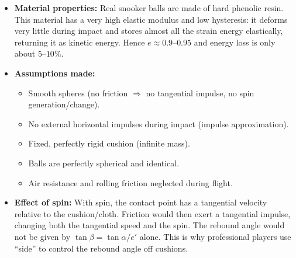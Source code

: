 \documentclass[11pt]{article}
\begin{document}
\begin{corrige}
\begin{itemize}
\item \textbf{Material properties:} Real snooker balls are made of hard phenolic resin. This material has a very high elastic modulus and low hysteresis: it deforms very little during impact and stores almost all the strain energy elastically, returning it as kinetic energy. Hence $e \approx 0.9\text{--}0.95$ and energy loss is only about $5\text{--}10\%$.
\item \textbf{Assumptions made:}
      \begin{itemize}
      \item Smooth spheres (no friction $\Rightarrow$ no tangential impulse, no spin generation/change).
      \item No external horizontal impulses during impact (impulse approximation).
      \item Fixed, perfectly rigid cushion (infinite mass).
      \item Balls are perfectly spherical and identical.
      \item Air resistance and rolling friction neglected during flight.
      \end{itemize}
\item \textbf{Effect of spin:} With spin, the contact point has a tangential velocity relative to the cushion/cloth. Friction would then exert a tangential impulse, changing both the tangential speed and the spin. The rebound angle would not be given by $\tan\beta = \tan\alpha / e'$ alone. This is why professional players use ``side'' to control the rebound angle off cushions.
\end{itemize}
\end{corrige}
\end{document}
